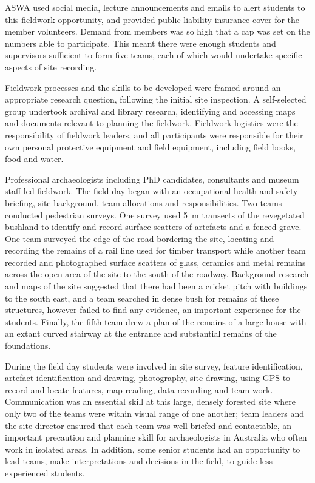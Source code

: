 \documentclass[%
]{ijsra}
\begin{document}
	ASWA used social media, lecture announcements and emails to alert students to this fieldwork opportunity, and provided public liability insurance cover for the member volunteers. 
	Demand from members was so high that a cap was set on the numbers able to participate. 
	This meant there were enough students and supervisors sufficient to form five teams, each of which would undertake specific aspects of site recording.
	
	Fieldwork processes and the skills to be developed were framed around an appropriate research question, following the initial site inspection. A self-selected group undertook archival and library research, identifying and accessing maps and documents relevant to planning the fieldwork.
	Fieldwork logistics were the responsibility of fieldwork leaders, and all participants were responsible for their own personal protective equipment and field equipment, including field books, food and water.
	
	Professional archaeologists including PhD candidates, consultants and museum staff led fieldwork. 
	The field day began with an occupational health and safety briefing, site background, team allocations and responsibilities. Two teams conducted pedestrian surveys. One survey used \SI{5}{\meter} transects of the revegetated bushland to identify and record surface scatters of artefacts and a fenced grave. 
	One team surveyed the edge of the road bordering the site, locating and recording the remains of a rail line used for timber transport while another team recorded and photographed surface scatters of glass, ceramics and metal remains across the open area of the site to the south of the roadway. 
	Background research and maps of the site suggested that there had been a cricket pitch with buildings to the south east, and a team searched in dense bush for remains of these structures, however failed to find any evidence, an important experience for the students. 
	Finally, the fifth team drew a plan of the remains of a large house with an extant curved stairway at the entrance and substantial remains of the foundations.
	
	During the field day students were involved in site survey, feature identification, artefact identification and drawing, photography, site drawing, using GPS to record and locate features, map reading, data recording and team work. 
	Communication was an essential skill at this large, densely forested site where only two of the teams were within visual range of one another; team leaders and the site director ensured that each team was well-briefed and contactable, an important precaution and planning skill for archaeologists in Australia who often work in isolated areas. 
	In addition, some senior students had an opportunity to lead teams, make interpretations and decisions in the field, to guide less experienced students.
	
\end{document}
